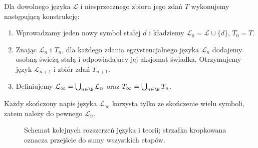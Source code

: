 \begin{definicja}\label{def:henkin-chain}
Dla dowolnego języka $\mathcal L$ i niesprzecznego zbioru jego zdań $T$ wykonujemy następującą konstrukcję:
\begin{enumerate}[label=(\roman*)]
\item Wprowadzamy jeden nowy symbol stałej $d$ i kładziemy $\mathcal L_0=\mathcal L\cup\{d\}$, $T_0=T$.
\item Znając $\mathcal L_n$ i $T_n$, dla każdego zdania egzystencjalnego języka $\mathcal L_n$ dodajemy osobną świeżą stałą i odpowiadający jej aksjomat świadka. Otrzymujemy język $\mathcal L_{n+1}$ i zbiór zdań $T_{n+1}$.
\item Definiujemy $\mathcal L_{\infty}=\bigcup_{n\in\N}\mathcal L_n$ oraz $T_{\infty}=\bigcup_{n\in\N}T_n$.
\end{enumerate}
Każdy skończony napis języka $\mathcal L_{\infty}$ korzysta tylko ze skończenie wielu symboli, zatem należy do pewnego $\mathcal L_n$.
\end{definicja}

\begin{figure}[htbp]
\centering
{}
\caption{Schemat kolejnych rozszerzeń języka i teorii; strzałka kropkowana oznacza przejście do sumy wszystkich etapów.}
\label{fig:henkin-chain}
\end{figure}

